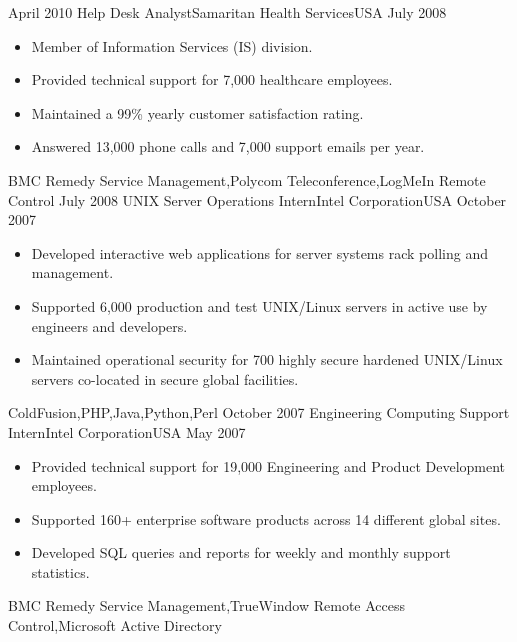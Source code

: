 \documentclass[localFont,alternative]{yaac-another-awesome-cv}
\begin{document}
\begin{experiences}
  \emptySeparator
  \experience
    {April 2010}    {Help Desk Analyst}{Samaritan Health Services}{USA}
    {July 2008}     {
                      \begin{itemize}
                        \item Member of Information Services (IS) division.
                        \item Provided technical support for 7,000 healthcare employees.
                        \item Maintained a 99\% yearly customer satisfaction rating.
                        \item Answered 13,000 phone calls and 7,000 support emails per year.                                                                   
                      \end{itemize}
                    }
    {BMC Remedy Service Management,Polycom Teleconference,LogMeIn Remote Control}
  \emptySeparator
  \experience
    {July 2008}    {UNIX Server Operations Intern}{Intel Corporation}{USA}
    {October 2007}  {
                      \begin{itemize}
                        \item Developed interactive web applications for server systems rack polling and management.
                        \item Supported 6,000 production and test UNIX/Linux servers in active use by engineers and developers.
                        \item Maintained operational security for 700 highly secure hardened UNIX/Linux servers co-located in secure global facilities.                                                                   
                      \end{itemize}
                    }
    {ColdFusion,PHP,Java,Python,Perl}
  \emptySeparator
  \experience
    {October 2007}  {Engineering Computing Support Intern}{Intel Corporation}{USA}
    {May 2007}      {
                      \begin{itemize}
                        \item Provided technical support for 19,000 Engineering and Product Development employees.
                        \item Supported 160+ enterprise software products across 14 different global sites.
                        \item Developed SQL queries and reports for weekly and monthly support statistics.
                      \end{itemize}
                    }
    {BMC Remedy Service Management,TrueWindow Remote Access Control,Microsoft Active Directory}
\end{experiences}
\end{document}
